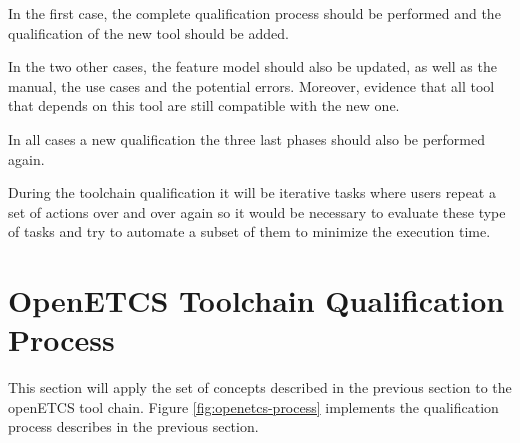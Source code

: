 In the first case, the complete qualification process should be
performed and the qualification of the new tool should be added.

In the two other cases, the feature model should also be updated, as
well as the manual, the use cases and the potential  errors.
Moreover, evidence that all tool that depends on this tool are still
compatible with the new one.  



In all cases a new qualification  the three last phases should also be
performed again.





During the toolchain qualification it will be iterative tasks where
users repeat a set of actions over and over again so it would be
necessary to evaluate these type of tasks and try to automate a subset
of them to minimize the execution time.




\section{OpenETCS Toolchain Qualification Process}
\label{sec:toolchain-qualification-process}

This section will apply the set of concepts described in the previous
section to the openETCS tool chain.
Figure \ref{fig:openetcs-process} implements the qualification process
describes in the previous section.

